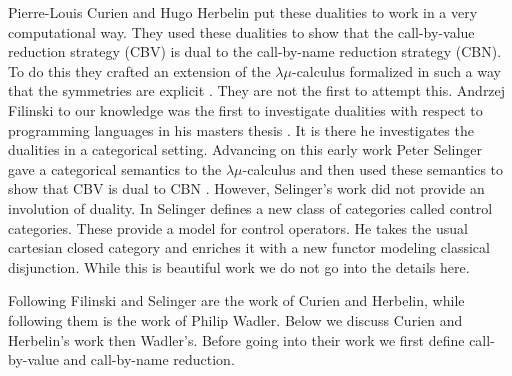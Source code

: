 Pierre-Louis Curien and Hugo Herbelin put these dualities to work in a
very computational way.  They used these dualities to show that the
call-by-value reduction strategy (CBV) is dual to the call-by-name
reduction strategy (CBN).  To do this they crafted an extension of the
$\lambda\mu$-calculus formalized in such a way that the symmetries are
explicit \cite{Curien:2000}.  They are not the first to attempt this.
Andrzej Filinski to our knowledge was the first to investigate
dualities with respect to programming languages in his masters thesis
\cite{Filinski:1989}.  It is there he investigates the dualities in a
categorical setting.  Advancing on this early work Peter Selinger gave
a categorical semantics to the $\lambda\mu$-calculus and then used
these semantics to show that CBV is dual to CBN \cite{Selinger:2001}.
However, Selinger's work did not provide an involution of duality.  In
\cite{Selinger:2001} Selinger defines a new class of categories called
control categories.  These provide a model for control operators.  He
takes the usual cartesian closed category and enriches it with a new
functor modeling classical disjunction.  While this is beautiful work
we do not go into the details here.

Following Filinski and Selinger are the work of Curien and Herbelin,
while following them is the work of Philip Wadler.  Below we discuss
Curien and Herbelin's work then Wadler's.  Before going into their work
we first define call-by-value and call-by-name reduction.

